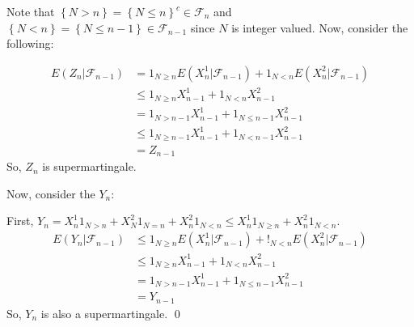 \begin{problem}[4.2.9] \hfill

	Note that $\left\{ N > n \right\} = \left\{ N \leq n \right\}^c \in \mathcal{F}_{n}$ and $\left\{ N<n \right\} = \left\{ N \leq n-1 \right\} \in \mathcal{F}_{n-1}$ since $N$ is integer valued. 
	Now, consider the following:

\[
	\begin{split}
		E(Z_n | \mathcal{F}_{n-1})
		& = 1_{N \geq n} E(X_n^1 | \mathcal{F}_{n-1}) + 1_{N < n} E(X_n^2 |\mathcal{F}_{n-1}) \\
		& \leq 1_{N \geq n} X_{n-1}^1 + 1_{N<n}X_{n-1}^2 \\
		& = 1_{N > n-1} X_{n-1}^1 + 1_{N \leq n-1} X_{n-1}^2 \\
		& \leq 1_{N \geq n-1} X_{n-1}^1 + 1_{N < n-1} X_{n-1}^2 \\
		& = Z_{n-1}
	\end{split}
\]
So, $Z_n$ is supermartingale.

	Now, consider the $Y_n$:
	
	First, $Y_n = X_n^1 1_{N>n} + X_N^2 1_{N=n} + X_n^2 1_{N<n} \leq X_n^1 1_{N\geq n} + X_n^2 1_{N <n}$.
\[
	\begin{split}
		E(Y_n |\mathcal{F}_{n-1})
		& \leq 1_{N\geq n} E\left( X_n^1 | \mathcal{F}_{n-1} \right) + !_{N<n}E\left( X_n^2 | \mathcal{F}_{n-1} \right) \\
		& \leq 1_{N \geq n} X_{n-1}^1 + 1_{N < n}X_{n-1}^2 \\
		& = 1_{N > n-1} X_{n-1}^1 + 1_{N \leq n-1}X_{n-1}^2 \\
		& = Y_{n-1}
	\end{split}
\]
So, $Y_n$ is also a supermartingale. \qed
\end{problem}
